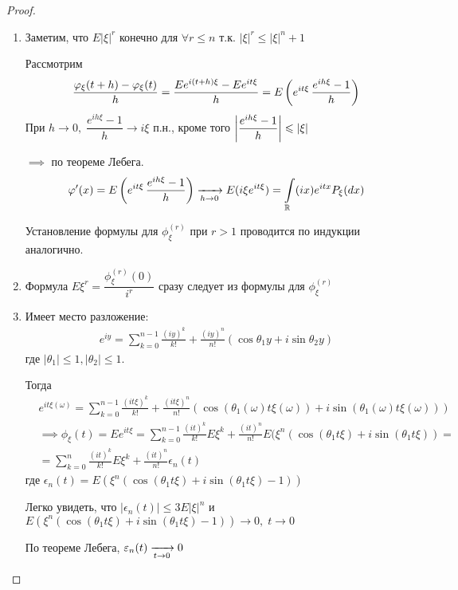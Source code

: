 \begin{proof}~

  \begin{enumerate}
    \item
      Заметим, что $E|\xi|^r$ конечно для $\forall r \leq n$ т.к. $|\xi|^r \leq |\xi|^n + 1$

      Рассмотрим 
      \begin{align*}
        \frac{\varphi_\xi(t + h) - \varphi_\xi (t)}{h} = \frac{E e^{i (t + h) \xi} - E e^{i t \xi}}{h}
        = E \left( e^{i t \xi}\, \frac{e^{i h \xi} - 1}{h} \right)
      \end{align*}
      При $h \to 0, \; \dfrac{e^{i h \xi} - 1}{h} \to i \xi$ п.н., 
      кроме того $\left |  \dfrac{e^{i h \xi} - 1}{h}  \right | \leqslant |\xi|$

      $\implies$ по теореме Лебега.
      \begin{align*}
        \varphi'(x) = E \left( e^{i t \xi}\, \frac{e^{i h \xi} - 1}{h} \right) \xrightarrow[h \to 0]{} E(i \xi e^{i t \xi})
        = \int\limits_{\mathbb{R}} (i x) e^{i t x} P_\xi (dx)
      \end{align*}

      Установление формулы для $\phi_{\xi}^{(r)}$ при $r > 1$ проводится по индукции аналогично.

    \item
      Формула $E \xi^r = \dfrac{\phi_{\xi}^{(r)} (0)}{i^r}$ сразу следует 
      из формулы для $\phi_\xi^{(r)}$

    \item
      Имеет место разложение:
      \begin{align*}
        e^{i y} = \sum_{k = 0}^{n - 1} \frac{(i y)^k}{k!} 
        + \frac{(i y)^n}{n!} (\cos \theta_1 y + i \sin \theta_2 y)
      \end{align*}
      где $|\theta_1| \leq 1, |\theta_2| \leq 1$.

      Тогда 
      \begin{align*}
        &e^{i t \xi(\omega)} = \sum_{k = 0}^{n - 1} \frac{(i t \xi)^k}{k!} 
        + \frac{(i t \xi)^n}{n!} (\cos (\theta_1(\omega) t \xi(\omega)) 
        + i \sin (\theta_1(\omega) t \xi(\omega)))\\
        &\implies \phi_{\xi} (t) = E e^{i t \xi} 
        = \sum_{k = 0}^{n - 1} \frac{(i t)^k}{k!} E \xi^k
        + \frac{(i t)^n}{n!} E (\xi^n (\cos (\theta_1 t \xi) + i \sin (\theta_1 t \xi)) =\\
        &= \sum_{k = 0}^{n} \frac{(i t)^k}{k!} E \xi^k + \frac{(i t)^n}{n!} \epsilon_n (t)
      \end{align*}
      где $\epsilon_n (t) = E (\xi^n (\cos (\theta_1 t \xi) + i \sin (\theta_1 t \xi) - 1))$
      
      Легко увидеть, что $|\epsilon_n (t)| \leq 3 E |\xi|^n$ и
      $E (\xi^n (\cos (\theta_1 t \xi) + i \sin (\theta_1 t \xi) - 1)) \to 0,\; t \to 0$

      По теореме Лебега, $\varepsilon_n(t) \xrightarrow[t \to 0]{} 0$
  \end{enumerate}
\end{proof}

